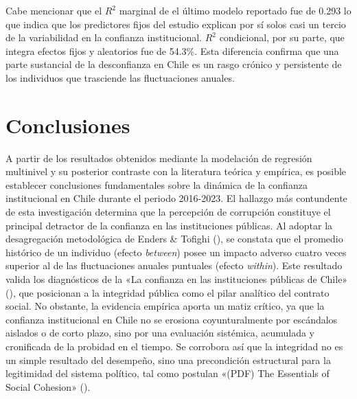 \documentclass[
  spanish,
  a4paper,
  oneside]{scrbook}
\begin{document}
Cabe mencionar que el \(R^2\) marginal de el último modelo reportado fue
de 0.293 lo que indica que los predictores fijos del estudio explican
por sí solos casi un tercio de la variabilidad en la confianza
institucional. \(R^2\) condicional, por su parte, que integra efectos
fijos y aleatorios fue de 54.3\%. Esta diferencia confirma que una parte
sustancial de la desconfianza en Chile es un rasgo crónico y persistente
de los individuos que trasciende las fluctuaciones anuales.


\chapter{Conclusiones}\label{conclusiones}

A partir de los resultados obtenidos mediante la modelación de regresión
multinivel y su posterior contraste con la literatura teórica y
empírica, es posible establecer conclusiones fundamentales sobre la
dinámica de la confianza institucional en Chile durante el periodo
2016-2023. El hallazgo más contundente de esta investigación determina
que la percepción de corrupción constituye el principal detractor de la
confianza en las instituciones públicas. Al adoptar la desagregación
metodológica de Enders \& Tofighi
(), se constata que el
promedio histórico de un individuo (efecto \emph{between}) posee un
impacto adverso cuatro veces superior al de las fluctuaciones anuales
puntuales (efecto \emph{within}). Este resultado valida los diagnósticos
de la {«{La confianza en las instituciones públicas de Chile}»}
(), que posicionan a la integridad
pública como el pilar analítico del contrato social. No obstante, la
evidencia empírica aporta un matiz crítico, ya que la confianza
institucional en Chile no se erosiona coyunturalmente por escándalos
aislados o de corto plazo, sino por una evaluación sistémica, acumulada
y cronificada de la probidad en el tiempo. Se corrobora así que la
integridad no es un simple resultado del desempeño, sino una
precondición estructural para la legitimidad del sistema político, tal
como postulan {«({PDF}) {The Essentials} of {Social Cohesion}»}
().
\end{document}
